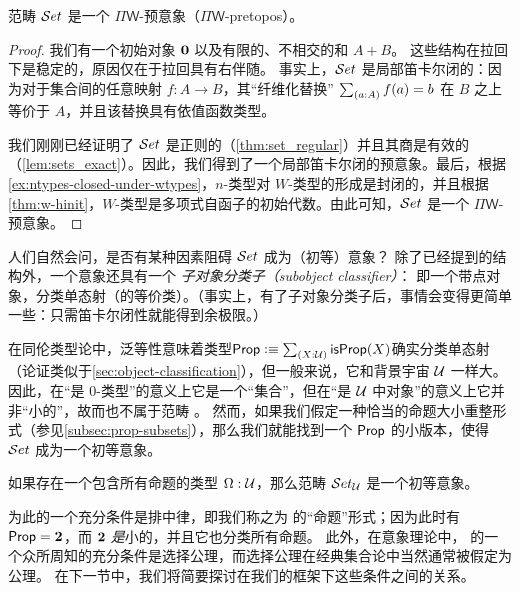 \begin{thm}
  范畴 $\mathcal{S}et$ 是一个 $\Pi\mathsf{W}$-预意象（$\Pi\mathsf{W}$-pretopos）。
\end{thm}

\begin{proof}
  我们有一个初始对象
  $\mathbf{0}$ 以及有限的、不相交的和 $A+B$。  这些结构在拉回下是稳定的，原因仅在于拉回具有右伴随。  事实上，$\mathcal{S}et$ 是局部笛卡尔闭的：因为对于集合间的任意映射 $f:A\to B$，其``纤维化替换'' $\sm{a:A}f(a)=b$ 在 $B$ 之上等价于 $A$，并且该替换具有依值函数类型。

我们刚刚已经证明了 $\mathcal{S}et$ 是正则的（\cref{thm:set_regular}）并且其商是有效的（\cref{lem:sets_exact}）。因此，我们得到了一个局部笛卡尔闭的预意象。最后，根据\cref{ex:ntypes-closed-under-wtypes}，$n$-类型对 $W$-类型的形成是封闭的，并且根据\cref{thm:w-hinit}，$W$-类型是多项式自函子的初始代数。由此可知，$\mathcal{S}et$ 是一个 $\Pi\mathsf{W}$-预意象。
\end{proof}

人们自然会问，是否有某种因素阻碍 $\mathcal{S}et$ 成为（初等）意象？
除了已经提到的结构外，一个意象还具有一个
\emph{子对象分类子（subobject classifier）}：
%
%
%
即一个带点对象，分类单态射（的等价类）。（事实上，有了子对象分类子后，事情会变得更简单一些：只需笛卡尔闭性就能得到余极限。）

在同伦类型论中，泛等性意味着类型$\prop \defeq \sm{X:\UU}\isprop(X)$确实分类单态射（论证类似于\cref{sec:object-classification}），但一般来说，它和背景宇宙 $\mathcal{U}$ 一样大。
因此，在``是 $0$-类型''的意义上它是一个``集合''，但在``是 $\mathcal{U}$ 中对象''的意义上它并非``小的''，故而也不属于范畴 \uset。
然而，如果我们假定一种恰当的命题大小重整形式（参见\cref{subsec:prop-subsets}），那么我们就能找到一个 $\mathsf{Prop}$ 的小版本，使得 $\mathcal{S}et$ 成为一个初等意象。

\begin{thm}\label{thm:settopos}
  如果存在一个包含所有命题的类型 $\Omega:\mathcal{U}$，那么范畴 $\mathcal{S}et_{\mathcal{U}}$ 是一个初等意象。
\end{thm}



为此的一个充分条件是排中律，即我们称之为 \LEM{} 的``命题''形式；因为此时有 $\mathsf{Prop} = \mathbf{2}$，而 $\mathbf{2}$ \emph{是}小的，并且它也分类所有命题。
此外，在意象理论中，\LEM{} 的一个众所周知的充分条件是选择公理，而选择公理在经典集合论中当然通常被假定为公理。
在下一节中，我们将简要探讨在我们的框架下这些条件之间的关系。

